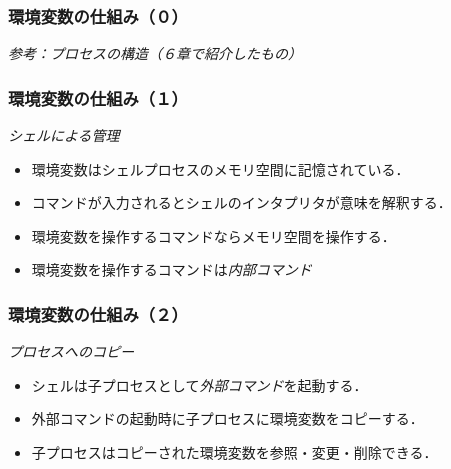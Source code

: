 \documentclass{beamer}                 %
\begin{document}

\begin{frame}[fragile]
  \frametitle{環境変数の仕組み（０）}
  \emph{参考：プロセスの構造（６章で紹介したもの）}
\end{frame}

\begin{frame}[fragile]
  \frametitle{環境変数の仕組み（１）}
  \emph{シェルによる管理}
  \begin{itemize}
  \item 環境変数はシェルプロセスのメモリ空間に記憶されている．
  \item コマンドが入力されるとシェルのインタプリタが意味を解釈する．
  \item 環境変数を操作するコマンドならメモリ空間を操作する．
  \item 環境変数を操作するコマンドは\emph{内部コマンド}
  \end{itemize}
\end{frame}

\begin{frame}[fragile]
  \frametitle{環境変数の仕組み（２）}
  \emph{プロセスへのコピー}
  \begin{itemize}
  \item シェルは子プロセスとして\emph{外部コマンド}を起動する．
  \item 外部コマンドの起動時に子プロセスに環境変数をコピーする．
  \item 子プロセスはコピーされた環境変数を参照・変更・削除できる．
  \end{itemize}
\end{frame}
\end{document}

